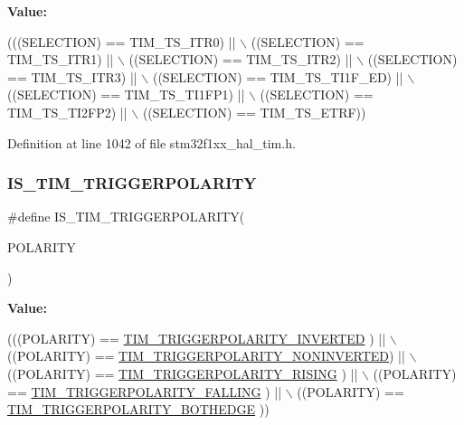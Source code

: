{\bfseries Value\+:}
\begin{DoxyCode}
(((SELECTION) == TIM\_TS\_ITR0)    || \(\backslash\)
                                             ((SELECTION) == TIM\_TS\_ITR1)    || \(\backslash\)
                                             ((SELECTION) == TIM\_TS\_ITR2)    || \(\backslash\)
                                             ((SELECTION) == TIM\_TS\_ITR3)    || \(\backslash\)
                                             ((SELECTION) == TIM\_TS\_TI1F\_ED) || \(\backslash\)
                                             ((SELECTION) == TIM\_TS\_TI1FP1)  || \(\backslash\)
                                             ((SELECTION) == TIM\_TS\_TI2FP2)  || \(\backslash\)
                                             ((SELECTION) == TIM\_TS\_ETRF))
\end{DoxyCode}


Definition at line 1042 of file stm32f1xx\+\_\+hal\+\_\+tim.\+h.

\mbox{\label{group___t_i_m___private___macros_ga1ef30af856d490f62cf34943b604a8cf}} 
\subsubsection{\texorpdfstring{I\+S\+\_\+\+T\+I\+M\+\_\+\+T\+R\+I\+G\+G\+E\+R\+P\+O\+L\+A\+R\+I\+TY}{IS\_TIM\_TRIGGERPOLARITY}}
{\footnotesize\ttfamily \#define I\+S\+\_\+\+T\+I\+M\+\_\+\+T\+R\+I\+G\+G\+E\+R\+P\+O\+L\+A\+R\+I\+TY(\begin{DoxyParamCaption}\item[{}]{P\+O\+L\+A\+R\+I\+TY }\end{DoxyParamCaption})}

{\bfseries Value\+:}
\begin{DoxyCode}
(((POLARITY) == \hyperlink{group___t_i_m___trigger___polarity_ga64337379c3762dca395b812c65656de4}{TIM\_TRIGGERPOLARITY\_INVERTED}   ) || \(\backslash\)
                                              ((POLARITY) == 
      \hyperlink{group___t_i_m___trigger___polarity_gad985881cdfddb63dfc52e6aaca776ff6}{TIM\_TRIGGERPOLARITY\_NONINVERTED}) || \(\backslash\)
                                              ((POLARITY) == 
      \hyperlink{group___t_i_m___trigger___polarity_ga64b521aa367d745ec00a763449634ace}{TIM\_TRIGGERPOLARITY\_RISING}     ) || \(\backslash\)
                                              ((POLARITY) == 
      \hyperlink{group___t_i_m___trigger___polarity_ga77df5988527ca829743dd57d2f867972}{TIM\_TRIGGERPOLARITY\_FALLING}    ) || \(\backslash\)
                                              ((POLARITY) == 
      \hyperlink{group___t_i_m___trigger___polarity_gaa72eb9fd278575ff05aa3dd1c173dcc8}{TIM\_TRIGGERPOLARITY\_BOTHEDGE}   ))
\end{DoxyCode}


